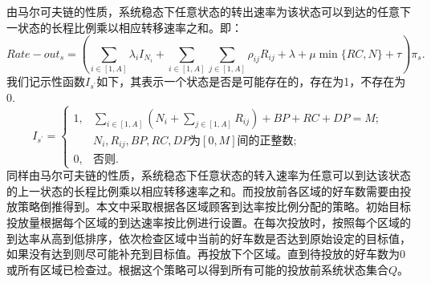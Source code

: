\documentclass{article}
\begin{document}
由马尔可夫链的性质，系统稳态下任意状态的转出速率为该状态可以到达的任意下一状态的长程比例乘以相应转移速率之和。即：
\begin{equation}
Rate-out_{s} = (\sum \limits _{i \in [1,A]}\lambda_i I_{N_i}+\sum \limits _{i \in [1,A]} \sum \limits _{j \in [1,A]} \rho_{ij} R_{ij}+\lambda +\mu \min \{RC, N\} + \tau )\pi_s.
\end{equation}
我们记示性函数$I_{s^{'}}$如下，其表示一个状态是否是可能存在的，存在为1，不存在为0.
\begin{equation}
I_{s^{'}}=
    \left\{
        \begin{array}{lcl}
            1, &\sum \limits _{i \in [1,A]}(N_i+\sum \limits _{j \in [1,A]}R_{ij})+BP+RC+DP= M;\\ & N_i, R_{ij}, BP, RC, DP\mbox{为}[0,M]\mbox{间的正整数};\\
            0, &\mbox{否则}.
        \end{array}
    \right .  
\end{equation}
同样由马尔可夫链的性质，系统稳态下任意状态的转入速率为任意可以到达该状态的上一状态的长程比例乘以相应转移速率之和。而投放前各区域的好车数需要由投放策略倒推得到。本文中采取根据各区域顾客到达率按比例分配的策略。初始目标投放量根据每个区域的到达速率按比例进行设置。在每次投放时，按照每个区域的到达率从高到低排序，依次检查区域中当前的好车数是否达到原始设定的目标值，如果没有达到则尽可能补充到目标值。再投放下个区域。直到待投放的好车数为0或所有区域已检查过。根据这个策略可以得到所有可能的投放前系统状态集合$Q$。
\end{document}
